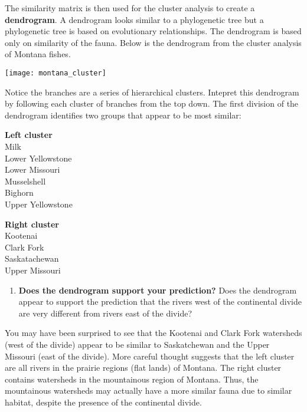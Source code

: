 \documentclass[11pt]{article}
\begin{document}
The similarity matrix is then used for the cluster analysis to create a \textbf{dendrogram}.
A dendrogram looks similar to a phylogenetic tree but a phylogenetic tree is
based on evolutionary relationships. The dendrogram is based only on similarity
of the fauna. Below is the dendrogram from the cluster analysis of Montana fishes.

	\texttt{[image: montana\_cluster]}

Notice the branches are a series of hierarchical clusters. Intepret this dendrogram
by following each cluster of branches from the top down. The first division of the dendrogram 
identifies two groups that appear to be most similar:

\begin{multicols}{2}
\textbf{Left cluster}\\
Milk\\
Lower Yellowstone\\
Lower Missouri\\
Musselshell\\
Bighorn\\
Upper Yellowstone
\columnbreak

\textbf{Right cluster}\\
Kootenai\\
Clark Fork\\
Saskatachewan\\
Upper Missouri
\end{multicols}

\begin{enumerate}[resume,leftmargin=*]
\item \textbf{Does the dendrogram support your prediction?} Does the dendrogram appear
to support the prediction that the rivers west of the continental divide are very different
from rivers east of the divide?%
\end{enumerate}

\newpage

You may have been surprised to see that the Kootenai and Clark Fork watersheds 
(west of the divide) appear to be similar to Saskatchewan and the Upper Missouri 
(east of the divide). More careful thought suggests that the left cluster are all rivers in
the prairie regions (flat lands) of Montana. The right cluster contains watersheds in
the mountainous region of Montana. Thus, the mountainous watersheds may actually
have a more similar fauna due to similar habitat, despite the presence of the continental
divide.
\end{document}
